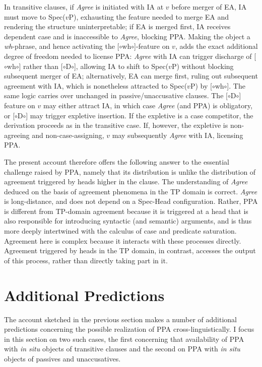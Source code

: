 \documentclass[11pt, letterpaper]{paper_nick}
\newcommand{\fm}[1]{[$\circ$#1$\circ$]}
\begin{document}
In transitive clauses, if \emph{Agree} is initiated with IA at $v$ before merger of EA, IA must move to Spec($v$P), exhausting the feature needed to merge EA and rendering the structure uninterpretable; if EA is merged first, IA receives dependent case and is inaccessible to \emph{Agree}, blocking PPA. Making the object a \emph{wh}-phrase, and hence activating the \fm{wh}-feature on $v$, adds the exact additional degree of freedom needed to license PPA: \emph{Agree} with IA can trigger discharge of \fm{wh} rather than \fm{D}, allowing IA to shift to Spec($v$P) without blocking subsequent merger of EA; alternatively, EA can merge first, ruling out subsequent agreement with IA, which is nonetheless attracted to Spec($v$P) by \fm{wh}. The same logic carries over unchanged in passive/unaccusative clauses. The \fm{D} feature on $v$ may either attract IA, in which case \emph{Agree} (and PPA) is obligatory, or \fm{D} may trigger expletive insertion. If the expletive is a case competitor, the derivation proceeds as in the transitive case. If, however, the expletive is non-agreeing and non-case-assigning, $v$ may subsequently \emph{Agree} with IA, licensing PPA.  


The present account therefore offers the following answer to the essential challenge raised by PPA, namely that its distribution is unlike the distribution of agreement triggered by heads higher in the clause. The understanding of \emph{Agree} deduced on the basis of agreement phenomena in the TP domain is correct. \emph{Agree} is long-distance, and does not depend on a Spec-Head configuration. Rather, PPA is different from TP-domain agreement because it is triggered at a head that is also responsible for introducing syntactic (and semantic) arguments, and is thus more deeply intertwined with the calculus of case and predicate saturation. Agreement here is complex because it interacts with these processes directly. Agreement triggered by heads in the TP domain, in contrast, accesses the output of this process, rather than directly taking part in it.  

\section{Additional Predictions}
The account sketched in the previous section makes a number of additional predictions concerning the possible realization of PPA cross-linguistically. I focus in this section on two such cases, the first concerning that availability of PPA with \emph{in situ} objects of transitive clauses and the second on PPA with \emph{in situ} objects of passives and unaccusatives.  
\end{document}

